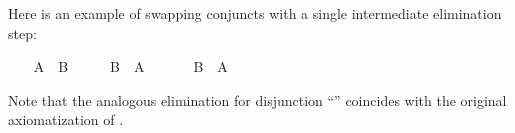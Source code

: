 \begin{isabellebody}
%
\begin{isamarkuptext}%
\noindent Here is an example of swapping conjuncts with a single
  intermediate elimination step:%
\end{isamarkuptext}%
\isamarkuptrue%
%
\isadelimproof
%
\endisadelimproof
%
\isatagproof
\ \ \isamarkupfalse%
\ {\isachardoublequoteopen}A\ {\isasymand}\ B{\isachardoublequoteclose}\isanewline
\ \ \isamarkupfalse%
\ \isamarkupfalse%
\ B\ \ A\ \isacommand{{\isachardot}{\isachardot}}\isamarkupfalse%
\isanewline
\ \ \isamarkupfalse%
\ \isamarkupfalse%
\ {\isachardoublequoteopen}B\ {\isasymand}\ A{\isachardoublequoteclose}\ \isacommand{{\isachardot}{\isachardot}}\isamarkupfalse%
%
\endisatagproof
{\isafoldproof}%
%
\isadelimproof
%
\endisadelimproof
%
\begin{isamarkuptext}%
Note that the analogous elimination for disjunction ``'' coincides with the
  original axiomatization of .


\end{isamarkuptext}
\end{isabellebody}
